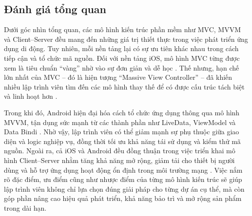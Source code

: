 \subsection{Đánh giá tổng quan}
\renewcommand{\labelitemi}{--}    
    \begin{flushleft}
        \hspace*{0.8cm}Dưới góc nhìn tổng quan, các mô hình kiến trúc phần mềm như MVC, MVVM và Client–Server đều mang đến những giá trị thiết thực trong việc phát triển ứng dụng di động. Tuy nhiên, mỗi nền tảng lại có sự ưu tiên khác nhau trong cách tiếp cận và tổ chức mã nguồn. Đối với nền tảng iOS, mô hình MVC từng được xem là tiêu chuẩn “vàng” nhờ vào sự đơn giản và dễ học \cite{mvc_ios_standard}. Thế nhưng, hạn chế lớn nhất của MVC – đó là hiện tượng “Massive View Controller” – đã khiến nhiều lập trình viên tìm đến các mô hình thay thế để có được cấu trúc tách biệt và linh hoạt hơn \cite{massive_view_controller}.
    \end{flushleft}

    \begin{flushleft}
        \hspace*{0.8cm}Trong khi đó, Android hiện đại hóa cách tổ chức ứng dụng thông qua mô hình MVVM, tận dụng sức mạnh từ các thành phần như LiveData, ViewModel và Data Bindi \cite{android_mvvm_google} . Nhờ vậy, lập trình viên có thể giảm mạnh sự phụ thuộc giữa giao diện và logic nghiệp vụ, đồng thời tối ưu khả năng tái sử dụng và kiểm thử mã nguồn. Ngoài ra, cả iOS và Android đều đồng thuận trong việc triển khai mô hình Client–Server nhằm tăng khả năng mở rộng, giảm tải cho thiết bị người dùng và hỗ trợ ứng dụng hoạt động ổn định trong môi trường mạng \cite{client_server_mobile}. Việc nắm rõ đặc điểm, ưu điểm cũng như nhược điểm của từng mô hình kiến trúc sẽ giúp lập trình viên không chỉ lựa chọn đúng giải pháp cho từng dự án cụ thể, mà còn góp phần nâng cao hiệu quả phát triển, khả năng bảo trì và mở rộng sản phẩm trong dài hạn.
    \end{flushleft}
